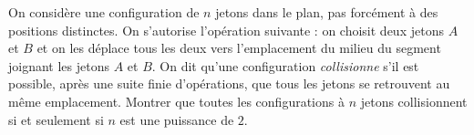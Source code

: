On considère une configuration de $n$ jetons dans le plan, pas forcément à des positions distinctes. On s'autorise l'opération suivante : on choisit deux jetons $A$ et $B$ et on les déplace tous les deux vers l'emplacement du milieu du segment joignant les jetons $A$ et $B$. On dit qu'une configuration \textit{collisionne} s'il est possible, après une suite finie d'opérations, que tous les jetons se retrouvent au même emplacement. Montrer que toutes les configurations à $n$ jetons collisionnent si et seulement si $n$ est une puissance de $2$.